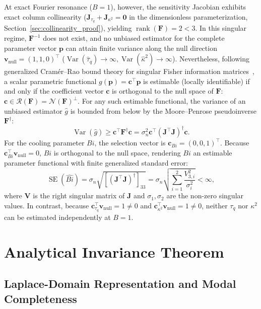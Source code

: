 \documentclass[preprint,12pt]{elsarticle}
\begin{document}
At exact Fourier resonance ($B = 1$), however, the sensitivity Jacobian exhibits exact column collinearity ($\bm{J}_{\tau_q} + \bm{J}_{\kappa^2} = \bm{0}$ in the dimensionless parameterization, Section~\ref{sec:collinearity_proof}), yielding $\operatorname{rank}(\bm{F}) = 2 < 3$. In this singular regime, $\bm{F}^{-1}$ does not exist, and no unbiased estimator for the complete parameter vector $\bm{p}$ can attain finite variance along the null direction $\bm{v}_{\mathrm{null}} = (1, 1, 0)^\top$ ($\operatorname{Var}(\hat{\tau}_q) \to \infty, \operatorname{Var}(\hat{\kappa}^2) \to \infty$). Nevertheless, following generalized Cramér--Rao bound theory for singular Fisher information matrices~\cite{walter1997identification}, a scalar parametric functional $g(\bm{p}) = \bm{c}^\top \bm{p}$ is estimable (locally identifiable) if and only if the coefficient vector $\bm{c}$ is orthogonal to the null space of $\bm{F}$: $\bm{c} \in \mathcal{R}(\bm{F}) = \mathcal{N}(\bm{F})^\perp$. For any such estimable functional, the variance of an unbiased estimator $\hat{g}$ is bounded from below by the Moore--Penrose pseudoinverse $\bm{F}^\dagger$:
\begin{equation}
\operatorname{Var}(\hat{g}) \ge \bm{c}^\top \bm{F}^\dagger \bm{c} = \sigma_n^2 \bm{c}^\top (\bm{J}^\top \bm{J})^\dagger \bm{c}.
\label{eq:generalized_crlb}
\end{equation}
For the cooling parameter $Bi$, the selection vector is $\bm{c}_{Bi} = (0, 0, 1)^\top$. Because $\bm{c}_{Bi}^\top \bm{v}_{\mathrm{null}} = 0$, $Bi$ is orthogonal to the null space, rendering $Bi$ an estimable parameter functional with finite generalized standard error:
\begin{equation}
\operatorname{SE}(\hat{Bi}) = \sigma_n \sqrt{[(\bm{J}^\top \bm{J})^\dagger]_{33}} = \sigma_n \sqrt{\sum_{i=1}^2 \frac{V_{3,i}^2}{\sigma_i^2}} < \infty,
\label{eq:se_bi_def}
\end{equation}
where $\bm{V}$ is the right singular matrix of $\bm{J}$ and $\sigma_1, \sigma_2$ are the non-zero singular values. In contrast, because $\bm{c}_{\tau_q}^\top \bm{v}_{\mathrm{null}} = 1 \ne 0$ and $\bm{c}_{\kappa^2}^\top \bm{v}_{\mathrm{null}} = 1 \ne 0$, neither $\tau_q$ nor $\kappa^2$ can be estimated independently at $B = 1$.

\section{Analytical Invariance Theorem}

\subsection{Laplace-Domain Representation and Modal Completeness}
\end{document}
